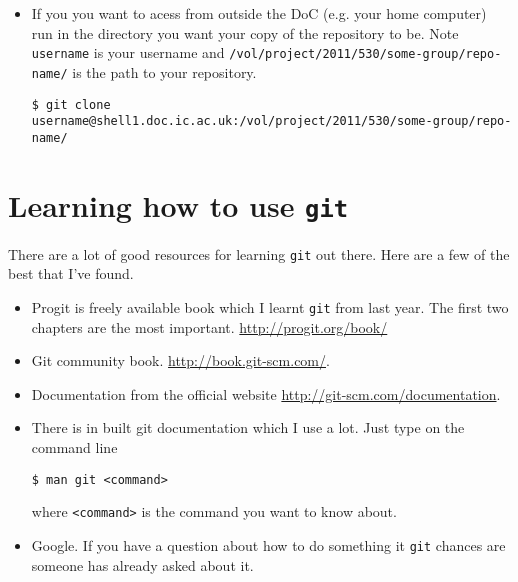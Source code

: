 \documentclass[a4paper,10pt,fleqn]{article}
\begin{document}
\begin{enumerate}
\begin{itemize}
			\item If you you want to acess from outside the DoC (e.g. your home computer) run in the directory you want your copy of the repository to be. Note \texttt{username} is your username and \texttt{/vol/project/2011/530/some-group/repo-name/} is the path to your repository.
			\begin{lstlisting}
$ git clone username@shell1.doc.ic.ac.uk:/vol/project/2011/530/some-group/repo-name/
			\end{lstlisting}

		\end{itemize}

		\end{enumerate}

\section{Learning how to use \texttt{git}}
There are a lot of good resources for learning \texttt{git} out there. Here are a few of the best that I've found.
\begin{itemize}
	\item Progit is freely available book which I learnt \texttt{git} from last year. The first two chapters are the most important. \url{http://progit.org/book/} 
	\item Git community book. \url{http://book.git-scm.com/}.
	\item Documentation from the official website \url{http://git-scm.com/documentation}.
	\item There is in built git documentation which I use a lot. Just type on the command line
	\begin{lstlisting}
$ man git <command>
	\end{lstlisting}
	where \texttt{<command>} is the command you want to know about.
	\item Google. If you have a question about how to do something it \texttt{git} chances are someone has already asked about it.

\end{itemize}
\end{document}
